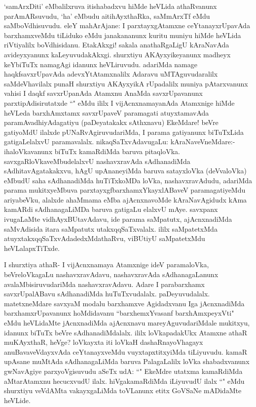 \begin{artha}
`samArxDiti' eMbalilxruva itishabadxvu hiMde heVLida athaRvanunx parAmARsuvudu, `ha' eMbudu aitihAyxthaRka, saMmArxTf eMdu saMboVdhisuvudu. eleY mahArAjane: I parxtayxgAtamxne ceYtanayxrUpavAda barxhamxveMdu tiLiduko eMdu janakananunx kuritu muniyu hiMde heVLida riVtiyalilx boVdhisidanu. EtakAkxgi! sakala anathaRgaLigU kAraNavAda avideyxyanunx kaLeyuvudakAkxgi. shurxtiyu AKAyxyikeyanunx madheyx keYbiTuTx namagAgi idanunx heVLiruvudu. adariMda namage haqkfsavxrUpavAda adevxYtAtamxnalilx Adaravu uMTAguvudaralilx saMdeVhavilalx punaH shurxtiyu AKAyxyikA rUpadalilx muniya pAtarxvanunx vahisi I daqkf savxrUpanAda Atamxnu AnaMda savxrUpavanunx parxtipAdisirutatxde ``\stext " eMdu ililx I vijAcnxnamayanAda Atamxnige hiMde heVLeda barxhAmxtamx savxrUpaveV paramagati atuyxtamavAda paramAvadhiyAdagatiyu (paDeyatakakx sAthxnavu) EkeMdare! beVre gatiyoMdU ilalxde pUNaRvAgiruvudariMda, I parama gatiyanunx biTuTxLida gatigaLelalxvU paramavalalx. nikaqSaTxvAdavugaLu: kAraNaveVneMdare:- ihaloVkavanunx biTuTx kamaRdiMda baruva pitaqloVka. savxgaRloVkaveMbudelalxvU nashavxravAda sAdhanadiMda sAdhitavAgatakakxvu, hAgU upAnaneyiMda baruva satayxloVka (deVvaloVka) eMbudU saha sAdhanadiMda huTiTxkoMDa loVka, nashavxravAdudu, adariMda parama mukitxyeMbuva parxtayxgfbarxhamxYkayxlABaveV paramagatiyeMdu ariyabeVku, alalxde ahaMmama eMba ajAcnxnavoMde kAraNavAgidudx kAma kamARdi sAdhanagaLiMDa baruva gatigaLu elalxvU mAye. savxpanx ivugaLaMte vidhAyxBUtavAdavu, ide parama saMpatutx, ajAcnxnadiMda saMvAdisida itara saMpatutx utakxqqSaTxvalalx. ililx saMpatetxMda atuyxtakxqqSaTxvAdadedxMdathaRvu, viBUtiyU saMpatetxMdu heVLalapxTiTxde. 
\end{artha}%

\begin{artha}
I shurxtiya athaR- I vijAcnxnamaya Atamxnige ideV paramaloVka, beVreloVkagaLu nashavxravAdavu, nashavxravAda sAdhanagaLanunx avalaMbisiruvudariMda nashavxravAdavu. Adare I parabarxhamx savxrUpalABavu sAdhanadiMda huTuTxvudalalx. paDeyuvudalalx. matetxneMdare savxyaM modalu barxhamxve Agidadxvanu Iga jAcnxnadiMda barxhamxrUpavanunx hoMdidavanu ``barxhemxYvasanf barxhAmxpeyxVti" eMdu heVLidaMte jAcnxnadiMda ajAcnxnavu mareyAguvudariMdale mukitxyu, idanunx biTuTx beVre sAdhanadiMdalalx. ililx loVkapadakUkx Atamxne athaR muKAyxthaR, heVge? loVkayxta iti loVkaH dashaRnayoVhagayx anuBavaveVdayxvAda ceYtanayxveMdu vuyxtapxtitxyiMda tiLiyuvudu. kamaR upAsane muMtAda sAdhanagaLiMda baruva PalagaLalilx loVka shabadxvanunx gwNavAgiye parxyoVgisuvudu aSeTx udA: ``\stext " EkeMdre utatxma kamaRdiMda aMtarAtamxnu hecucxvudU ilalx. hiVgakamaRdiMda iLiyuvudU ilalx ``\stext " eMdu shurxtiyu veVdAMta vakayxgaLiMda toVLanunx etitx GoVSaNe mADidaMte heVLide. 
\end{artha}%

